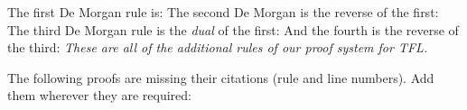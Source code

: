 The first De Morgan rule is:
The second De Morgan is the reverse of the first:
The third De Morgan rule is the \emph{dual} of the first:
And the fourth is the reverse of the third:
\emph{These are all of the additional rules of our proof system for TFL.}

\practiceproblems
\solutions
\problempart
\label{pr.justifyTFLproof}
The following proofs are missing their citations (rule and line numbers). Add them wherever they are required:
\begin{multicols}{2}
\begin{pf}
 {}
 {}
\end{pf}
%
\vfill
%
\begin{pf}
\open
\close
{}
\end{pf}
%
\columnbreak
%
\begin{pf}
\open
\close
{}
\open
\close
{}
\end{pf}
\end{multicols}

